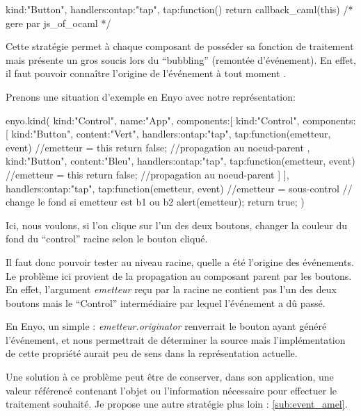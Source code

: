 \documentclass[11pt,a4paper]{report}
\begin{document}
\begin{JavaScript}
  {kind:"Button", handlers:{ontap:"tap"}, 
    tap:function(){ return callback_caml(this) /* gere par js_of_ocaml */ }}
\end{JavaScript}

Cette stratégie permet à chaque composant de posséder sa fonction de traitement mais présente 
un gros soucis lors du ``bubbling'' (remontée d'événement). En effet, il faut pouvoir connaître l'origine
de l'événement à tout moment .

Prenons une situation d'exemple en Enyo avec notre représentation:
\begin{JavaScript}
enyo.kind({
    kind:"Control",
    name:"App",
    components:[
      {
        kind:"Control",
        components:[
          {kind:"Button", content:"Vert",         
            handlers:{ontap:"tap"},
            tap:function(emetteur, event){
              //emetteur = this 
              return false; //propagation au noeud-parent
            }
          },
          {kind:"Button", content:"Bleu",         
            handlers:{ontap:"tap"},
            tap:function(emetteur, event){
              //emetteur = this
              return false; //propagation au noeud-parent
            }
          }
        ]
        }
      ],
    handlers:{ontap:"tap"},
    tap:function(emetteur, event){
      //emetteur = sous-control
      // change le fond si emetteur est b1 ou b2 
      alert(emetteur);
      return true;
    }
})
\end{JavaScript}

Ici, nous voulons, si l'on clique sur l'un des deux boutons, changer la couleur du fond du
``control'' racine selon le bouton cliqué.

Il faut donc pouvoir tester au niveau racine, quelle a été l'origine des événements.
Le problème ici provient de la propagation au composant parent par les boutons.
En effet, l'argument \emph{emetteur} reçu par la racine ne contient pas l'un des deux boutons
mais le ``Control'' intermédiaire par lequel l'événement a dû passé.

En Enyo, un simple : \emph{emetteur.originator} renverrait le bouton ayant généré l'événement,
et nous permettrait de déterminer la source mais l'implémentation de cette propriété aurait 
peu de sens dans la représentation actuelle.

Une solution à ce problème peut être de conserver, dans son application, une valeur référencé 
contenant l'objet ou l'information nécessaire pour effectuer le traitement souhaité.
Je propose une autre stratégie plus loin : \ref{sub:event_amel}.
\end{document}
